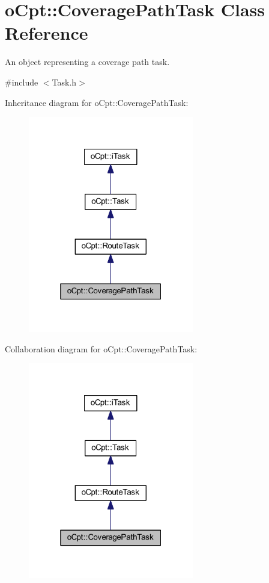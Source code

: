 \hypertarget{classo_cpt_1_1_coverage_path_task}{}\section{o\+Cpt\+:\+:Coverage\+Path\+Task Class Reference}
\label{classo_cpt_1_1_coverage_path_task}


An object representing a coverage path task.  




{\ttfamily \#include $<$Task.\+h$>$}



Inheritance diagram for o\+Cpt\+:\+:Coverage\+Path\+Task\+:\nopagebreak
\begin{figure}[H]
\begin{center}
\leavevmode
\includegraphics[width=205pt]{classo_cpt_1_1_coverage_path_task__inherit__graph}
\end{center}
\end{figure}


Collaboration diagram for o\+Cpt\+:\+:Coverage\+Path\+Task\+:\nopagebreak
\begin{figure}[H]
\begin{center}
\leavevmode
\includegraphics[width=205pt]{classo_cpt_1_1_coverage_path_task__coll__graph}
\end{center}
\end{figure}
